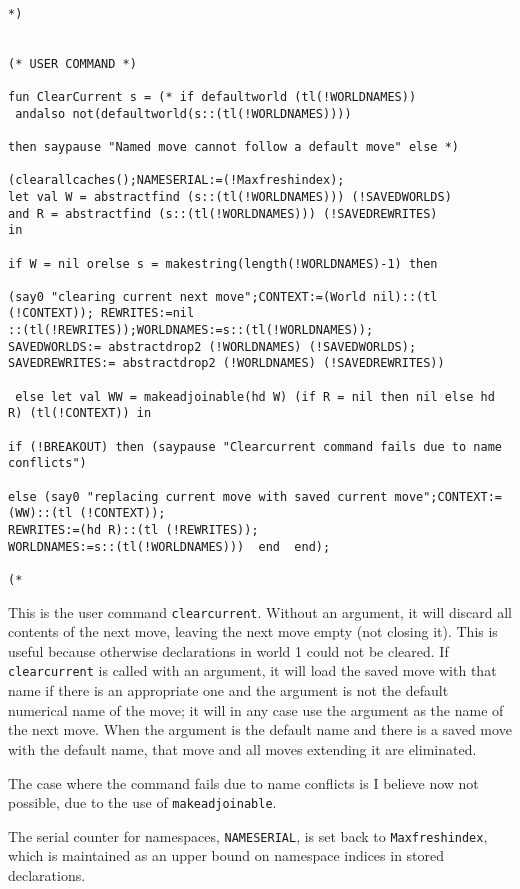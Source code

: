 \documentclass{article}
\begin{document}
\begin{verbatim}

*)


(* USER COMMAND *)

fun ClearCurrent s = (* if defaultworld (tl(!WORLDNAMES))
 andalso not(defaultworld(s::(tl(!WORLDNAMES))))

then saypause "Named move cannot follow a default move" else *)

(clearallcaches();NAMESERIAL:=(!Maxfreshindex);
let val W = abstractfind (s::(tl(!WORLDNAMES))) (!SAVEDWORLDS) 
and R = abstractfind (s::(tl(!WORLDNAMES))) (!SAVEDREWRITES)
in

if W = nil orelse s = makestring(length(!WORLDNAMES)-1) then

(say0 "clearing current next move";CONTEXT:=(World nil)::(tl (!CONTEXT)); REWRITES:=nil
::(tl(!REWRITES));WORLDNAMES:=s::(tl(!WORLDNAMES)); 
SAVEDWORLDS:= abstractdrop2 (!WORLDNAMES) (!SAVEDWORLDS);
SAVEDREWRITES:= abstractdrop2 (!WORLDNAMES) (!SAVEDREWRITES))

 else let val WW = makeadjoinable(hd W) (if R = nil then nil else hd R) (tl(!CONTEXT)) in

if (!BREAKOUT) then (saypause "Clearcurrent command fails due to name conflicts")

else (say0 "replacing current move with saved current move";CONTEXT:=(WW)::(tl (!CONTEXT)); 
REWRITES:=(hd R)::(tl (!REWRITES)); 
WORLDNAMES:=s::(tl(!WORLDNAMES)))  end  end);

(*

\end{verbatim}

This is the user command {\tt clearcurrent}.  Without an argument, it will discard all contents of the next move, leaving the next move empty (not closing it).
This is useful because otherwise declarations in world 1 could not be cleared.  If {\tt clearcurrent} is called with an argument, it will load the saved move with that
name if there is an appropriate one and the argument is not the default numerical name of the move;  it will in any case use the argument as the name of the next move.  When the argument is the default name and there is a saved move with the default name, that move and all moves extending it are eliminated.

The case where the command fails due to name conflicts is I believe now not possible, due to the use of {\tt makeadjoinable}.

The serial counter for namespaces, {\tt NAMESERIAL}, is set back to {\tt Maxfreshindex}, which is maintained as an upper bound on namespace indices in stored declarations.
\end{document}
